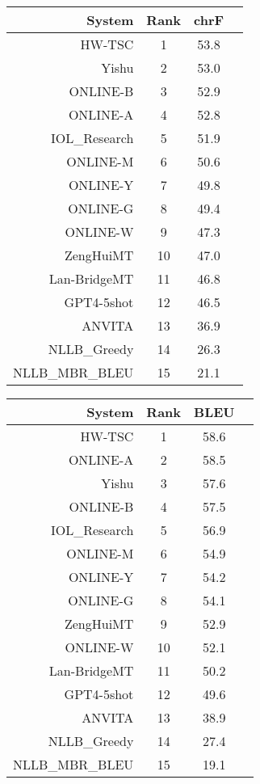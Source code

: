 \documentclass[11pt]{article}
\begin{document}
\begin{table}  
\scriptsize\begin{subtable}[t]{0.33\textwidth}
\begin{tabular}{rccc}
\toprule 
System & Rank & chrF \\ 
\midrule 
HW-TSC & 1 & 53.8 \\ 
Yishu & 2 & 53.0 \\ 
ONLINE-B & 3 & 52.9 \\ 
ONLINE-A & 4 & 52.8 \\ 
IOL\_Research & 5 & 51.9 \\ 
ONLINE-M & 6 & 50.6 \\ 
ONLINE-Y & 7 & 49.8 \\ 
ONLINE-G & 8 & 49.4 \\ 
ONLINE-W & 9 & 47.3 \\ 
ZengHuiMT & 10 & 47.0 \\ 
Lan-BridgeMT & 11 & 46.8 \\ 
GPT4-5shot & 12 & 46.5 \\ 
ANVITA & 13 & 36.9 \\ 
NLLB\_Greedy & 14 & 26.3 \\ 
NLLB\_MBR\_BLEU & 15 & 21.1 \\ 
\bottomrule 
\end{tabular} 
\end{subtable} 
\begin{subtable}[t]{0.33\textwidth}
\begin{tabular}{rccc}
\toprule 
System & Rank & BLEU \\ 
\midrule 
HW-TSC & 1 & 58.6 \\ 
ONLINE-A & 2 & 58.5 \\ 
Yishu & 3 & 57.6 \\ 
ONLINE-B & 4 & 57.5 \\ 
IOL\_Research & 5 & 56.9 \\ 
ONLINE-M & 6 & 54.9 \\ 
ONLINE-Y & 7 & 54.2 \\ 
ONLINE-G & 8 & 54.1 \\ 
ZengHuiMT & 9 & 52.9 \\ 
ONLINE-W & 10 & 52.1 \\ 
Lan-BridgeMT & 11 & 50.2 \\ 
GPT4-5shot & 12 & 49.6 \\ 
ANVITA & 13 & 38.9 \\ 
NLLB\_Greedy & 14 & 27.4 \\ 
NLLB\_MBR\_BLEU & 15 & 19.1 \\ 

\end{tabular}
\end{subtable}
\end{table}
\end{document}
